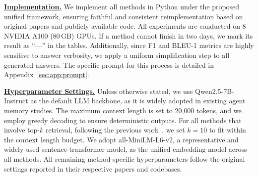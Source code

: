 \noindent  {} \textbf{\underline{Implementation.}}
We implement all methods in Python under the proposed unified framework, ensuring faithful and consistent reimplementation based on original papers and publicly available code. All experiments are conducted on 8 NVIDIA A100 (80\,GB) GPUs. If a method cannot finish in two days, we mark its result as ``---'' in the tables.
Additionally, since F1 and BLEU-1 metrics are highly sensitive to answer verbosity, we apply a uniform simplification step to all generated answers. The specific prompt for this process is detailed in Appendix~\ref{sec:app:prompt}.


\noindent  {} \textbf{\underline{Hyperparameter Settings.}}
Unless otherwise stated, we use Qwen2.5-7B-Instruct as the default LLM backbone, as it is widely adopted in existing agent memory studies. The maximum context length is set to 20{,}000 tokens, and we employ greedy decoding to ensure deterministic outputs. For all methods that involve top-$k$ retrieval, following the previous work~\cite{kang2025memory,rezazadeh2024isolated,wujiang2025amem}, we set $k = 10$ to fit within the context length budget. We adopt all-MiniLM-L6-v2, a representative and widely-used sentence-transformer model, as the unified embedding model across all methods. All remaining method-specific hyperparameters follow the original settings reported in their respective papers and codebases.